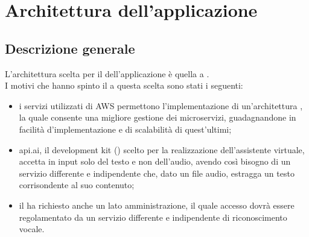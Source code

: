 \section{Architettura dell'applicazione}
\subsection{Descrizione generale}
L'architettura scelta per il  dell'applicazione è quella a .\\
I motivi che hanno spinto il  a questa scelta sono stati i seguenti:
\begin{itemize}
	\item i servizi utilizzati di AWS permettono l'implementazione di un'architettura , la quale consente una migliore gestione dei microservizi, guadagnandone in facilità d'implementazione e di scalabilità di quest'ultimi;
	\item api.ai, il  development kit () scelto per la realizzazione dell'assistente virtuale, accetta in input solo del testo e non dell'audio, avendo così bisogno di un servizio differente e indipendente che, dato un file audio, estragga un testo corrisondente al suo contenuto;
	\item il  ha richiesto anche un lato amministrazione, il quale accesso dovrà essere regolamentato da un servizio differente e indipendente di riconoscimento vocale.
\end{itemize}

